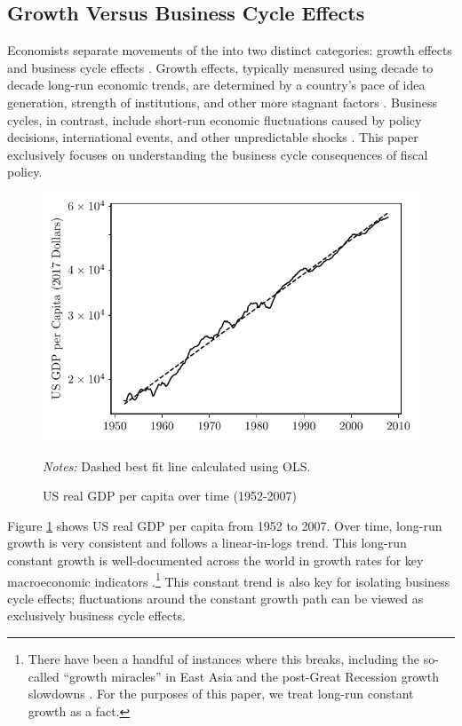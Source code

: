\subsection{Growth Versus Business Cycle Effects} \label{subsec:detrend}

Economists separate movements of the into two distinct categories: growth effects and business cycle effects \parencite{stulz1985macroeconomic}. Growth effects, typically measured using decade to decade long-run economic trends, are determined by a country's pace of idea generation, strength of institutions, and other more stagnant factors \parencites{acemoglu2001colonial}{jones2016facts}{jones2019paul}. Business cycles, in contrast, include short-run economic fluctuations caused by policy decisions, international events, and other unpredictable shocks \parencites{lucas1995understanding}{mitchell2024business}. This paper exclusively focuses on understanding the business cycle consequences of fiscal policy.

\begin{figure}[t]
    \centering
    \caption{US real GDP per capita over time (1952-2007)}
    \includegraphics{figures/growth_effects.pdf}

    {\scriptsize \emph{Notes:} Dashed best fit line calculated using OLS.}
    \label{fig:growth-effects}
\end{figure}

Figure \ref{fig:growth-effects} shows US real GDP per capita from 1952 to 2007. Over time, long-run growth is very consistent and follows a linear-in-logs trend. This long-run constant growth is well-documented across the world in growth rates for key macroeconomic indicators \parencites{papell2014long}.\footnote{There have been a handful of instances where this breaks, including the so-called ``growth miracles'' in East Asia \parencite{easterly199511} and the post-Great Recession growth slowdowns \parencites{benigno2018stagnation}. For the purposes of this paper, we treat long-run constant growth as a fact.} This constant trend is also key for isolating business cycle effects; fluctuations around the constant growth path can be viewed as exclusively business cycle effects.

